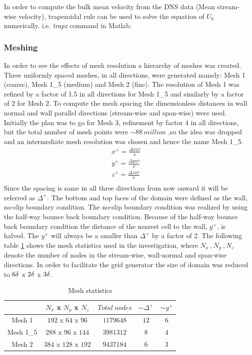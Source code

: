 In order to compute the bulk mean velocity from the DNS data (Mean stream-wise velocity), trapezoidal rule can be used to solve the equation of $U_b$ numerically. i.e. \emph{trapz} command in Matlab. 
\subsubsection{Meshing}
In order to see the effects of mesh resolution a hierarchy of meshes was created. Three uniformly spaced meshes, in all directions, were generated namely: Mesh 1 (coarse), Mesh 1\_5 (medium) and Mesh 2 (fine). The resolution of Mesh 1 was refined by a factor of 1.5 in all directions for Mesh 1\_5 and similarly by a factor of 2 for Mesh 2. To compute the mesh spacing the dimensionless distances in wall normal and wall parallel directions (stream-wise and span-wise) were used. Initially the plan was to go for Mesh 3, refinement by factor 4 in all directions, but the total number of mesh points were $\sim 88\ million$ ,so the idea was dropped and an intermediate mesh resolution was chosen and hence the name Mesh 1\_5.
\begin{equation}
\label{Dimensionless distances}
\begin{split}
x^+ = \frac{\Delta x u\tau}{\nu}\\
y^+ = \frac{\Delta y u\tau}{\nu}\\
z^+ = \frac{\Delta z u\tau}{\nu}\\
\end{split}
\end{equation} 
Since the spacing is same in all three directions from now onward it will be referred as $\Delta^+$. The bottom and top faces of the domain were defined as the wall, no-slip boundary condition. The no-slip boundary condition was realized by using the half-way bounce back boundary condition. Because of the half-way bounce back boundary condition the distance of the nearest cell to the wall, $y^+$, is halved. The $y^+$ will always be a smaller than $\Delta^+$ by a factor of 2. The following table \ref{Mesh statistics} shows the mesh statistics used in the investigation, where $N_x\ , N_y\ , N_z$ denote the number of nodes in the stream-wise, wall-normal and span-wise directions. In order to facilitate the grid generator the size of domain was reduced to $6\delta$ x $2\delta$ x $3\delta$.
%
\begin{table}[!h]
\centering
\begin{tabular}{c|c|c|c|c}
$ $ & $N_x$ x $N_y$ x $N_z$ & $Total\ nodes$ & $\sim \Delta^+$ & $\sim y^+$ \\
\hline
%
Mesh 1 & $192$ x $64$ x $96$ & $1179648$ &$12$ & $6$ \\
\hline
%
Mesh 1\_5 & $288$ x $96$ x $144$ & $3981312$ & $8$ & $4$   \\
\hline
%
Mesh 2 & $384$ x $128$ x $192$ & $9437184$ &$6$ & $3$ \\
\hline
%
\end{tabular}
\caption{Mesh statistics}
\label{Mesh statistics}
\end{table}\\
